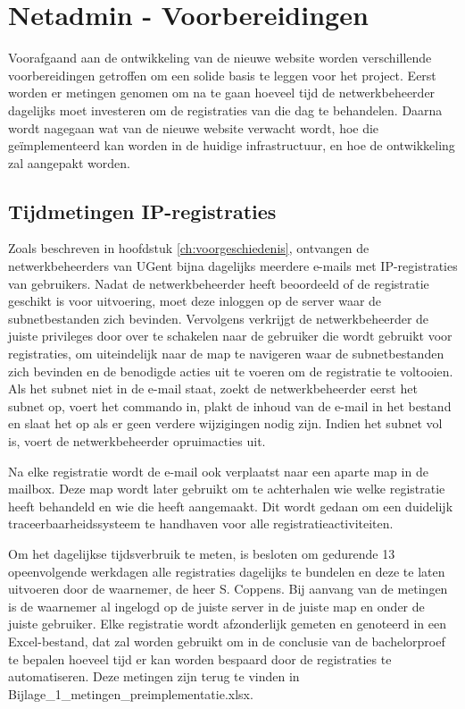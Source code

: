 
\chapter{Netadmin - Voorbereidingen}%
\label{ch:netadmin-voorbereidingen}

Voorafgaand aan de ontwikkeling van de nieuwe website worden verschillende voorbereidingen getroffen om een solide basis te leggen voor het project. Eerst worden er metingen genomen om na te gaan hoeveel tijd de netwerkbeheerder dagelijks moet investeren om de registraties van die dag te behandelen. Daarna wordt nagegaan wat van de nieuwe website verwacht wordt, hoe die geïmplementeerd kan worden in de huidige infrastructuur, en hoe de ontwikkeling zal aangepakt worden.

\section{Tijdmetingen IP-registraties}
Zoals beschreven in hoofdstuk \ref{ch:voorgeschiedenis}, ontvangen de netwerkbeheerders van UGent bijna dagelijks meerdere e-mails met IP-registraties van gebruikers. Nadat de netwerkbeheerder heeft beoordeeld of de registratie geschikt is voor uitvoering, moet deze inloggen op de server waar de subnetbestanden zich bevinden. Vervolgens verkrijgt de netwerkbeheerder de juiste privileges door over te schakelen naar de gebruiker die wordt gebruikt voor registraties, om uiteindelijk naar de map te navigeren waar de subnetbestanden zich bevinden en de benodigde acties uit te voeren om de registratie te voltooien. Als het subnet niet in de e-mail staat, zoekt de netwerkbeheerder eerst het subnet op, voert het commando in, plakt de inhoud van de e-mail in het bestand en slaat het op als er geen verdere wijzigingen nodig zijn. Indien het subnet vol is, voert de netwerkbeheerder opruimacties uit.

Na elke registratie wordt de e-mail ook verplaatst naar een aparte map in de mailbox. Deze map wordt later gebruikt om te achterhalen wie welke registratie heeft behandeld en wie die heeft aangemaakt. Dit wordt gedaan om een duidelijk traceerbaarheidssysteem te handhaven voor alle registratieactiviteiten.

Om het dagelijkse tijdsverbruik te meten, is besloten om gedurende 13 opeenvolgende werkdagen alle registraties dagelijks te bundelen en deze te laten uitvoeren door de waarnemer, de heer S. Coppens. Bij aanvang van de metingen is de waarnemer al ingelogd op de juiste server in de juiste map en onder de juiste gebruiker. Elke registratie wordt afzonderlijk gemeten en genoteerd in een Excel-bestand, dat zal worden gebruikt om in de conclusie van de bachelorproef te bepalen hoeveel tijd er kan worden bespaard door de registraties te automatiseren. Deze metingen zijn terug te vinden in Bijlage\_1\_metingen\_preimplementatie.xlsx.


